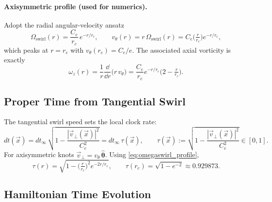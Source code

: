 \documentclass[12pt]{article}
\newcommand{\Ce}{C_e}
\newcommand{\rc}{r_c}
\begin{document}
\begin{tcolorbox}[enhanced, breakable, sharp corners, colback=gray!2, colframe=black!40, title={Swirl-Based Hamiltonian, Time Dilation, and Emergent Geometry in VAM}]
        \paragraph{Axisymmetric profile (used for numerics).}
        Adopt the radial angular-velocity ansatz
        \begin{equation}
            \Omega_{\text{swirl}}(r)=\frac{\Ce}{\rc}\,e^{-r/\rc},
            \qquad
            v_\theta(r)=r\,\Omega_{\text{swirl}}(r)=\Ce\Big(\tfrac{r}{\rc}\Big)e^{-r/\rc},
            \label{eq:omegaswirl_profile}
        \end{equation}
        which peaks at \(r=\rc\) with \(v_\theta(\rc)=\Ce/e\). The associated axial vorticity is exactly
        \begin{equation}
            \omega_z(r)=\frac{1}{r}\frac{\dd}{\dd r}\big(r\,v_\theta\big)
            =\frac{\Ce}{\rc}e^{-r/\rc}\Big(2-\tfrac{r}{\rc}\Big).
            \label{eq:omega_z_exact}
        \end{equation}

        \subsection{Proper Time from Tangential Swirl}
        \label{subsec:proper_time}

        The tangential swirl speed sets the local clock rate:
        \begin{equation}
            dt(\vec{x})=dt_\infty\,\sqrt{1-\frac{|\vec{v}_\perp(\vec{x})|^{2}}{\Ce^{2}}}
            =dt_\infty\,\tau(\vec{x}),
            \qquad
            \tau(\vec{x}):=\sqrt{1-\frac{|\vec{v}_\perp(\vec{x})|^{2}}{\Ce^{2}}}\in[0,1].
            \label{eq:time_dilation_velocity}
        \end{equation}
        For axisymmetric knots \( \vec{v}_\perp=v_\theta\,\hat{\bm\theta}\). Using \eqref{eq:omegaswirl_profile},
        \begin{equation}
            \tau(r)=\sqrt{1-\Big(\tfrac{r}{\rc}\Big)^{2}e^{-2r/\rc}},
            \qquad
            \tau(\rc)=\sqrt{1-e^{-2}}\approx 0.929873.
        \end{equation}

        \subsection{Hamiltonian Time Evolution}
        \label{subsec:ham_evolution}


\end{tcolorbox}
\end{document}
